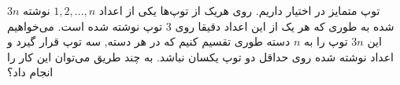     \p
    $3n$
     توپ متمایز در اختیار داریم. روی هریک از توپ‌ها یکی از اعداد 
    $1, 2, \dots, n$ نوشته شده به طوری که هر یک از این اعداد دقیقا روی $3$ توپ نوشته شده ‌است. می‌خواهیم این 
    $3n$ توپ را به $n$ دسته طوری تقسیم کنیم که در هر دسته, سه توپ قرار گیرد و اعداد نوشته شده روی حداقل دو توپ یکسان نباشد. به چند طریق می‌توان این کار را انجام داد؟